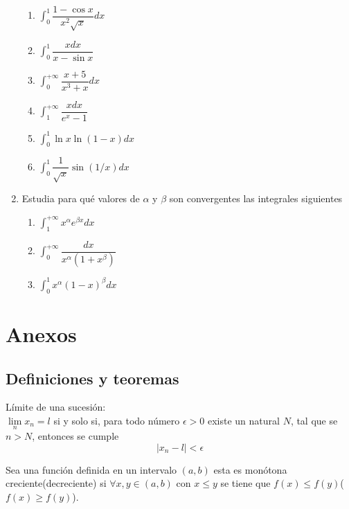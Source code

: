\documentclass[10pt,twoside]{SelfArx} %
\begin{document}
\begin{enumerate}
\begin{enumerate}
	 	\item $ \displaystyle\int_{0}^{1}\dfrac{1-\cos x}{x^{2}\sqrt{x}}dx $
	 	\item $ \displaystyle\int_{0}^{1}\dfrac{xdx}{x-\sin x} $
	 	\item $ \displaystyle\int_{0}^{+\infty}\dfrac{x+5}{x^{3}+x}dx $
	 	\item $ \displaystyle\int_{1}^{+\infty}\dfrac{xdx}{e^{x}-1} $
	 	\item $ \displaystyle\int_{0}^{1}\ln x\ln(1-x)dx $
	 	\item $ \displaystyle\int_{0}^{1}\dfrac{1}{\sqrt{x}}\sin (1/x)dx $
	 \end{enumerate}
	 \item Estudia para qué valores de $ \alpha $ y $ \beta $ son convergentes las integrales siguientes
	  \begin{enumerate}
	  	\item $ \displaystyle\int_{1}^{+\infty}x^{\alpha}e^{\beta x}dx $
	  	\item $ \displaystyle\int_{0}^{+\infty}\dfrac{dx}{x^{\alpha}(1+x^{\beta})} $
	  	\item $ \displaystyle\int_{0}^{1}x^{\alpha}(1-x)^{\beta}dx $
	  \end{enumerate}
\end{enumerate}
 
 
 
 
 
 
 
 
 
\section{Anexos}

\subsection{Definiciones y teoremas}
\begin{thm}
	Límite de una sucesión:\\
	$ \lim\limits_{n}x_{n}=l $ si y solo si, para todo número $ \epsilon>0 $ existe un  natural $ N $, tal que se $ n>N $,
	entonces se cumple \[ |x_{n}-l|<\epsilon \]
	
\end{thm}
\begin{thm}
	Sea una funci\'on definida en un intervalo $ (a,b) $ esta es mon\'otona creciente(decreciente) si $ \forall x,y\in(a,b) $ con $ x\leq y $ se tiene que $ f(x)\leq f(y) $($ f(x)\geq f(y) $).
\end{thm}
\end{document}
